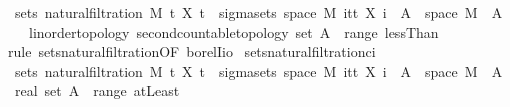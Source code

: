 \begin{isabellebody}
\ \ {\isachardoublequoteopen}sets\ {\isacharparenleft}{\kern0pt}natural{\isacharunderscore}{\kern0pt}filtration\ M\ t\ X\ t{\isacharparenright}{\kern0pt}\ {\isacharequal}{\kern0pt}\ sigma{\isacharunderscore}{\kern0pt}sets\ {\isacharparenleft}{\kern0pt}space\ M{\isacharparenright}{\kern0pt}\ {\isacharparenleft}{\kern0pt}{\isasymUnion}i{\isasymin}{\isacharbraceleft}{\kern0pt}tt{\isacharbraceright}{\kern0pt}{\isachardot}{\kern0pt}\ {\isacharbraceleft}{\kern0pt}X\ i\ {\isacharminus}{\kern0pt}{\isacharbackquote}{\kern0pt}\ A\ {\isasyminter}\ space\ M\ {\isacharbar}{\kern0pt}\ A\ {\isacharcolon}{\kern0pt}{\isacharcolon}{\kern0pt}\ {\isacharunderscore}{\kern0pt}\ {\isacharcolon}{\kern0pt}{\isacharcolon}{\kern0pt}\ {\isacharbraceleft}{\kern0pt}linorder{\isacharunderscore}{\kern0pt}topology{\isacharcomma}{\kern0pt}\ second{\isacharunderscore}{\kern0pt}countable{\isacharunderscore}{\kern0pt}topology{\isacharbraceright}{\kern0pt}\ set{\isachardot}{\kern0pt}\ A\ {\isasymin}\ range\ lessThan{\isacharbraceright}{\kern0pt}{\isacharparenright}{\kern0pt}{\isachardoublequoteclose}\ \isanewline
%
\isadelimproof
\ \ %
\endisadelimproof
%
\isatagproof
{}\isamarkupfalse%
\ {\isacharparenleft}{\kern0pt}rule\ sets{\isacharunderscore}{\kern0pt}natural{\isacharunderscore}{\kern0pt}filtration{\isacharprime}{\kern0pt}{\isacharbrackleft}{\kern0pt}OF\ borel{\isacharunderscore}{\kern0pt}Iio{\isacharbrackright}{\kern0pt}{\isacharparenright}{\kern0pt}%
\endisatagproof
{\isafoldproof}%
%
\isadelimproof
\isanewline
%
\endisadelimproof
\isanewline
{}\isamarkupfalse%
\ sets{\isacharunderscore}{\kern0pt}natural{\isacharunderscore}{\kern0pt}filtration{\isacharunderscore}{\kern0pt}ci{\isacharcolon}{\kern0pt}\isanewline
\ \ {\isachardoublequoteopen}sets\ {\isacharparenleft}{\kern0pt}natural{\isacharunderscore}{\kern0pt}filtration\ M\ t\ X\ t{\isacharparenright}{\kern0pt}\ {\isacharequal}{\kern0pt}\ sigma{\isacharunderscore}{\kern0pt}sets\ {\isacharparenleft}{\kern0pt}space\ M{\isacharparenright}{\kern0pt}\ {\isacharparenleft}{\kern0pt}{\isasymUnion}i{\isasymin}{\isacharbraceleft}{\kern0pt}tt{\isacharbraceright}{\kern0pt}{\isachardot}{\kern0pt}\ {\isacharbraceleft}{\kern0pt}X\ i\ {\isacharminus}{\kern0pt}{\isacharbackquote}{\kern0pt}\ A\ {\isasyminter}\ space\ M\ {\isacharbar}{\kern0pt}\ A\ {\isacharcolon}{\kern0pt}{\isacharcolon}{\kern0pt}\ real\ set{\isachardot}{\kern0pt}\ A\ {\isasymin}\ range\ atLeast{\isacharbraceright}{\kern0pt}{\isacharparenright}{\kern0pt}{\isachardoublequoteclose}\ \isanewline

\end{isabellebody}
